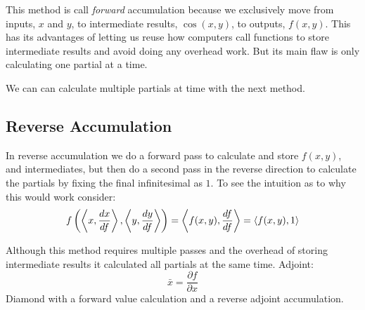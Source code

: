 This method is call {\em forward } accumulation because we exclusively move from inputs, $x$ and $y$, to intermediate results, $\cos(x,y)$, to outputs, $f(x,y)$.
This has its advantages of letting us reuse how computers call functions to store intermediate results and avoid doing any overhead work.
But its main flaw is only calculating one partial at a time.

We can can calculate multiple partials at time with the next method.

\subsection{Reverse Accumulation}
In reverse accumulation we do a forward pass to calculate and store $f(x,y)$,
and intermediates, 
but then do a second pass in the reverse direction to calculate the partials by fixing the final infinitesimal as $1$.
To see the intuition as to why this would work consider:
\[f\left(\left\langle x,\frac{dx}{df} \right\rangle,\left\langle y,\frac{dy}{df} \right\rangle\right) = \left\langle f(x,y),\frac{df}{df} \right\rangle = \left\langle f(x,y),1 \right\rangle\]

Although this method requires multiple passes and the overhead of storing intermediate results it calculated all partials at the same time.
Adjoint: 
\[\bar{x} = \frac{\partial f}{\partial x}\]
Diamond with a forward value calculation and a reverse adjoint accumulation.
